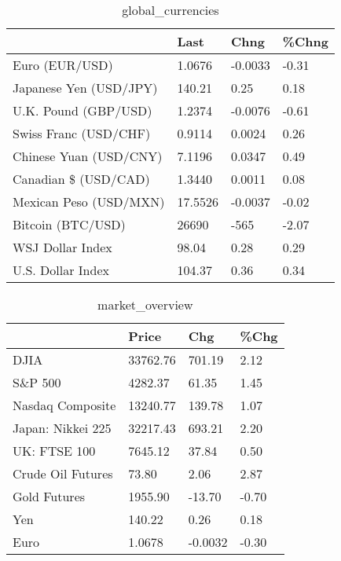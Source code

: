 \documentclass{article}%
\begin{document}
%


\begin{table}[htbp]%
\caption{global\_currencies}%
\centering%
\begin{adjustbox}{width=1\textwidth}%
\begin{tabular}{llll}
\toprule
                       &    Last &    Chng & \%Chng \\
\midrule
        Euro (EUR/USD) &  1.0676 & -0.0033 & -0.31 \\
Japanese Yen (USD/JPY) &  140.21 &    0.25 &  0.18 \\
  U.K. Pound (GBP/USD) &  1.2374 & -0.0076 & -0.61 \\
 Swiss Franc (USD/CHF) &  0.9114 &  0.0024 &  0.26 \\
Chinese Yuan (USD/CNY) &  7.1196 &  0.0347 &  0.49 \\
  Canadian \$ (USD/CAD) &  1.3440 &  0.0011 &  0.08 \\
Mexican Peso (USD/MXN) & 17.5526 & -0.0037 & -0.02 \\
     Bitcoin (BTC/USD) &   26690 &    -565 & -2.07 \\
      WSJ Dollar Index &   98.04 &    0.28 &  0.29 \\
     U.S. Dollar Index &  104.37 &    0.36 &  0.34 \\
\bottomrule
\end{tabular}
%
\end{adjustbox}%
\end{table}

%


\begin{table}[htbp]%
\caption{market\_overview}%
\centering%
\begin{adjustbox}{width=1\textwidth}%
\begin{tabular}{llll}
\toprule
                  &    Price &     Chg &  \%Chg \\
\midrule
             DJIA & 33762.76 &  701.19 &  2.12 \\
          S\&P 500 &  4282.37 &   61.35 &  1.45 \\
 Nasdaq Composite & 13240.77 &  139.78 &  1.07 \\
Japan: Nikkei 225 & 32217.43 &  693.21 &  2.20 \\
     UK: FTSE 100 &  7645.12 &   37.84 &  0.50 \\
Crude Oil Futures &    73.80 &    2.06 &  2.87 \\
     Gold Futures &  1955.90 &  -13.70 & -0.70 \\
              Yen &   140.22 &    0.26 &  0.18 \\
             Euro &   1.0678 & -0.0032 & -0.30 \\
\bottomrule
\end{tabular}
%
\end{adjustbox}%
\end{table}

%
\end{document}
